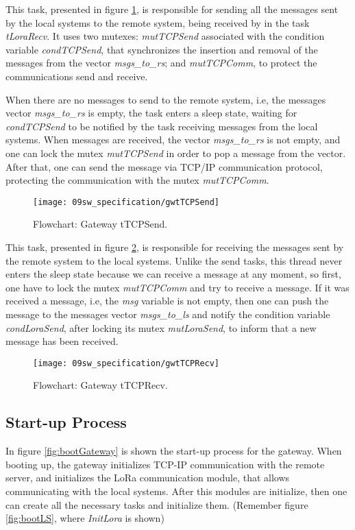 \clearpage
{}

This task, presented in figure \ref{fig:gwtTCPSend}, is responsible for sending all the messages sent by the local systems to the remote system, being received by in the task \textit{tLoraRecv}. It uses two mutexes: \textit{mutTCPSend} associated with the condition variable \textit{condTCPSend}, that synchronizes the insertion and removal of the messages from the vector \textit{msgs\_to\_rs}; and \textit{mutTCPComm}, to protect the communications send and receive.

When there are no messages to send to the remote system, i.e, the messages vector \textit{msgs\_to\_rs} is empty, the task enters a sleep state, waiting for \textit{condTCPSend} to be notified by the task receiving messages from the local systems. When messages are received, the vector \textit{msgs\_to\_rs} is not empty, and one can lock the mutex \textit{mutTCPSend} in order to pop a message from the vector. After that, one can send the message via TCP/IP communication protocol, protecting the communication with the mutex \textit{mutTCPComm}.

\begin{figure}[H]
	\centering
	\texttt{[image: 09sw\_specification/gwtTCPSend]}
	\caption{Flowchart: Gateway tTCPSend.}
	\label{fig:gwtTCPSend}
\end{figure}

This task, presented in figure \ref{fig:gwtTCPRecv}, is responsible for receiving the messages sent by the remote system to the local systems. Unlike the send tasks, this thread never enters the sleep state because we can receive a message at any moment, so first, one have to lock the mutex \textit{mutTCPComm} and try to receive a message. If it was received a message, i.e, the \textit{msg} variable is not empty, then one can push the message to the messages vector \textit{msgs\_to\_ls} and notify the condition variable \textit{condLoraSend}, after locking its mutex \textit{mutLoraSend}, to inform that a new message has been received.

\begin{figure}[H]
	\centering
	\texttt{[image: 09sw\_specification/gwtTCPRecv]}
	\caption{Flowchart: Gateway tTCPRecv.}
	\label{fig:gwtTCPRecv}
\end{figure}

\subsection{Start-up Process}
In figure \ref{fig:bootGateway} is shown the start-up process for the gateway. When booting up, the gateway initializes TCP-IP communication with the remote server, and initializes the LoRa communication module, that allows communicating with the local systems. After this modules are initialize, then one can create all the necessary tasks and initialize them. (Remember figure \ref{fig:bootLS}, where \textit{InitLora} is shown)

